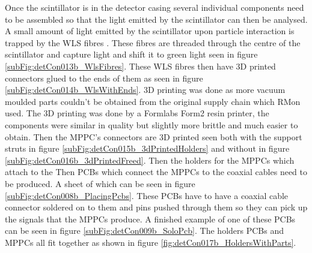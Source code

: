 Once the scintillator is in the detector casing several individual components need to be assembled so that the light emitted by the scintillator can then be analysed. A small amount of light emitted by the scintillator upon particle interaction is trapped by the WLS fibres . These fibres are threaded through the centre of the scintillator and capture light and shift it to green light seen in figure \ref{subFig:detCon013b_WlsFibres}. These WLS fibres then have 3D printed connectors glued to the ends of them as seen in figure \ref{subFig:detCon014b_WlsWithEnds}. 3D printing was done as more vacuum moulded parts couldn't be obtained from the original supply chain which RMon used. The 3D printing was done by a Formlabs Form2 resin printer, the components were similar in quality but slightly more brittle and much easier to obtain. Then the MPPC's connectors are 3D printed seen both with the support struts in figure \ref{subFig:detCon015b_3dPrintedHolders} and without in figure \ref{subFig:detCon016b_3dPrintedFreed}. Then the holders for the MPPCs which attach to the Then PCBs which connect the MPPCs to the coaxial cables need to be produced. A sheet of which can be seen in figure \ref{subFig:detCon008b_PlacingPcbs}. These PCBs have to have a coaxial cable connector soldered on to them and pins pushed through them so they can pick up the signals that the MPPCs produce. A finished example of one of these PCBs can be seen in figure \ref{subFig:detCon009b_SoloPcb}. The holders PCBs and MPPCs all fit together as shown in figure \ref{fig:detCon017b_HoldersWithParts}.

